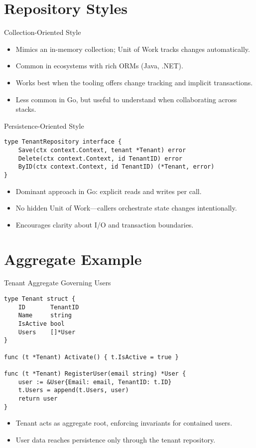 \documentclass{beamer}
\begin{document}
\section{Repository Styles}

\begin{frame}{Collection-Oriented Style}
  \begin{itemize}
    \item Mimics an in-memory collection; Unit of Work tracks changes automatically.
    \item Common in ecosystems with rich ORMs (Java, .NET).
    \item Works best when the tooling offers change tracking and implicit transactions.
    \item Less common in Go, but useful to understand when collaborating across stacks.
  \end{itemize}
\end{frame}

\begin{frame}[fragile]{Persistence-Oriented Style}
  \begin{lstlisting}
type TenantRepository interface {
    Save(ctx context.Context, tenant *Tenant) error
    Delete(ctx context.Context, id TenantID) error
    ByID(ctx context.Context, id TenantID) (*Tenant, error)
}
  \end{lstlisting}
  \begin{itemize}
    \item Dominant approach in Go: explicit reads and writes per call.
    \item No hidden Unit of Work—callers orchestrate state changes intentionally.
    \item Encourages clarity about I/O and transaction boundaries.
  \end{itemize}
\end{frame}

\section{Aggregate Example}

\begin{frame}[fragile]{Tenant Aggregate Governing Users}
  \begin{lstlisting}
type Tenant struct {
    ID       TenantID
    Name     string
    IsActive bool
    Users    []*User
}

func (t *Tenant) Activate() { t.IsActive = true }

func (t *Tenant) RegisterUser(email string) *User {
    user := &User{Email: email, TenantID: t.ID}
    t.Users = append(t.Users, user)
    return user
}
  \end{lstlisting}
  \begin{itemize}
    \item Tenant acts as aggregate root, enforcing invariants for contained users.
    \item User data reaches persistence only through the tenant repository.
  \end{itemize}
\end{frame}
\end{document}

